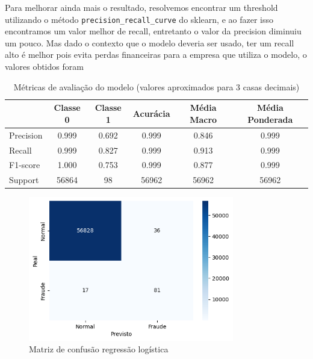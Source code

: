 \documentclass[a4paper,12pt]{article}
\begin{document}
  Para melhorar ainda mais o resultado, resolvemos encontrar um threshold utilizando o método \texttt{precision\_recall\_curve} do sklearn, e ao fazer isso encontramos um valor melhor de recall, entretanto o valor da precision diminuiu um pouco. Mas dado o contexto que o modelo deveria ser usado, ter um recall alto é melhor pois evita perdas financeiras para a empresa que utiliza o modelo, o valores obtidos foram
  \begin{table}[H]
    \centering
    \begin{tabular}{lccccc}
        \toprule
                           & \textbf{Classe 0} & \textbf{Classe 1} & \textbf{Acurácia} & \textbf{Média Macro} & \textbf{Média Ponderada} \\
        \midrule
        Precision  & 0.999  & 0.692  & 0.999  & 0.846  & 0.999   \\
        Recall     & 0.999  & 0.827  & 0.999  & 0.913  & 0.999   \\
        F1-score   & 1.000  & 0.753  & 0.999  & 0.877  & 0.999   \\
        Support    & 56864  & 98     & 56962  & 56962  & 56962   \\
        \bottomrule
    \end{tabular}
    \caption{Métricas de avaliação do modelo (valores aproximados para 3 casas decimais)}
    \label{tab:matriz_confusao_regressao_logistica_com_threshold}
\end{table}
  \begin{figure}[H]
    \centering
    \includegraphics[width=0.8\textwidth]{../output/matriz de confusao com threshold regressao logistica.png}
    \caption{Matriz de confusão regressão logística}
    \label{fig:matriz_confusao_regressao_logistica_com_threshold}
  \end{figure}
\end{document}
